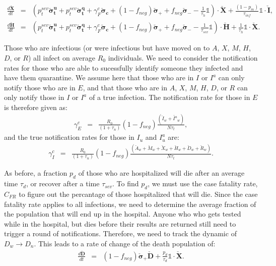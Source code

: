 \documentclass[notitlepage, superscriptaddress]{revtex4-2}
\begin{document}
\begin{eqnarray}
%
\frac{d \boldsymbol{\check{X}}}{dt} &=& \left( p^{sev}_{t} \boldsymbol{\check{\sigma}^{u}_{t}} + p^{sev}_{t} \boldsymbol{\check{\sigma}^{q}_{t}} + \gamma^{c}_{F} \boldsymbol{\check{\sigma}_{c}} + (1-f_{neg}) \boldsymbol{\check{\sigma}_{+}} + f_{neg} \boldsymbol{\check{\sigma}_{-}} - \frac{1}{\tau_{h}} \mathbb{1} \right) \cdot \boldsymbol{\check{X}} + \frac{(1-p_{m})}{\tau_{inf}} \mathbb{1} \cdot \boldsymbol{\check{I}}, \\
% 
\frac{d \boldsymbol{\check{H}}}{dt} &=& \left( p^{sev}_{t} \boldsymbol{\check{\sigma}^{u}_{t}} + p^{sev}_{t} \boldsymbol{\check{\sigma}^{q}_{t}} + \gamma^{c}_{F} \boldsymbol{\check{\sigma}_{c}} + (1-f_{neg}) \boldsymbol{\check{\sigma}_{+}} + f_{neg} \boldsymbol{\check{\sigma}_{-}} - \frac{1}{\tau_{sev}} \mathbb{1} \right) \cdot \boldsymbol{\check{H}} + \frac{1}{\tau_{h}} \mathbb{1} \cdot \boldsymbol{\check{X}}.
\end{eqnarray}

Those who are infectious (or were infectious but have moved on to $A$, $X$, $M$, $H$, $D$, or $R$) all infect on average $R_{0}$ individuals. We need to consider the notification rates for those who are able to sucessfully identify someone they infected and have them quarantine. We assume here that those who are in $I$ or $I^{a}$ can only notify those who are in $E$, and that those who are in $A$, $X$, $M$, $H$, $D$, or $R$ can only notify those in $I$ or $I^{a}$ of a true infection. The notification rate for those in $E$ is therefore given as:
\begin{eqnarray}
\gamma^{c}_{E} &=& \frac{R_{0}}{(1+\tau_{n})} (1-f_{neg}) \frac{(\check{I}_{w} + \check{I^{a}}_{w})}{N \tau_{t}},
\end{eqnarray} 
and the true notification rates for those in $I_{u}$ and $I^{a}_{u}$ are:
\begin{eqnarray}
\gamma^{c}_{I} &=&  \frac{R_{0}}{(1+\tau_{n})} (1-f_{neg}) \frac{(\check{A}_{w} + \check{M}_{w} + \check{X}_{w} + \check{H}_{w} + \check{D}_{w} + \check{R}_{w} )}{N\tau_{t}}.
\end{eqnarray}   

As before, a fraction $p_{d}$ of those who are hospitalized will die after an average time $\tau_{d}$, or recover after a time $\tau_{sev}$. To find $p_{d}$, we must use the case fatality rate, $C_{FR}$ to figure out the percantage of those hospitalized that will die. Since the case fatality rate applies to all infections, we need to determine the average fraction of the population that will end up in the hospital. Anyone who who gets tested while in the hospital, but dies before their results are returned still need to trigger a round of notifications. Therefore, we need to track the dynamic of $D_{w} \rightarrow D_{n}$. This leads to a rate of change of the death population of:
\begin{eqnarray}
\frac{d \boldsymbol{\check{D}}}{dt} &=& (1-f_{neg}) \boldsymbol{\check{\sigma}_{+}} \boldsymbol{\check{D}} +  \frac{p_{d}}{\tau_{d}} \mathbb{1} \cdot \boldsymbol{\check{X}}. 
\end{eqnarray}
\end{document}
